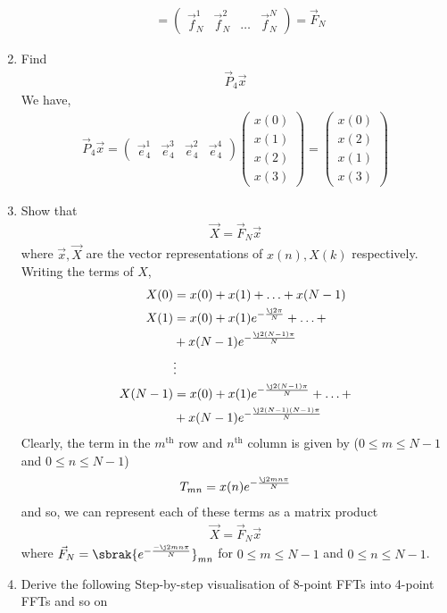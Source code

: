 \documentclass[journal,12pt,twocolumn]{IEEEtran}
\newcommand{\myvec}[1]{\ensuremath{\begin{pmatrix}#1\end{pmatrix}}}
\renewcommand\thesection{\arabic{section}}
\begin{document}
\begin{enumerate}[label=\thesection.\arabic*]
\begin{align}
	&= \myvec{\vec{f}_N^{1} & \vec{f}_N^{2} & \ldots & \vec{f}_N^{N}} = \vec{F}_N
\end{align}
\item Find 
    \begin{align}
	     \vec{P}_4 \vec{x}
    \end{align}
\solution We have,
\begin{align}
	\vec{P}_4\vec{x} = \myvec{\vec{e}_4^1 & \vec{e}_4^3 & \vec{e}_4^2 & \vec{e}_4^4}\myvec{x(0)\\x(1)\\x(2)\\x(3)} = \myvec{x(0)\\x(2)\\x(1)\\x(3)}
	\label{eq:x-permute}
\end{align}
\item Show that 
    \begin{align}
	    \vec{X} = \vec{F}_N\vec{x}
	    \label{eq:dft-mat-def}
    \end{align}
		where $\vec{x}, \vec{X}$ are the vector representations of $x(n), X(k)$ respectively. \\
\solution Writing the terms of $X$, 
\begin{align}
	X(0) &= x(0) + x(1) + \ldots + x(N - 1) \\
	X(1) &= x(0) + x(1)e^{-\frac{\j2\pi}{N}} + \ldots + \nonumber \\
		 &+ x(N - 1)e^{-\frac{\j2(N - 1)\pi}{N}} \\
		 &\vdots \nonumber \\
	X(N - 1) &= x(0) + x(1)e^{-\frac{\j2(N - 1)\pi}{N}} + \ldots + \nonumber \\
			 &+ x(N - 1)e^{-\frac{\j2(N - 1)(N - 1)\pi}{N}}	
\end{align}
Clearly, the term in the $m^{\text{th}}$ row and $n^{\text{th}}$ column is given by ($0 \leq m \leq N - 1$ and $0 \leq n \leq N - 1$) 
\begin{align}
	T_{mn} = x(n)e^{-\frac{\j2mn\pi}{N}} 
\end{align}
and so, we can represent each of these terms as a matrix product
\begin{align}
	\vec{X} = \vec{F}_N\vec{x}
\end{align}
where $\vec{F}_N = \sbrak{e^{-\frac{-\j2mn\pi}{N}}}_{mn}$ for $0 \leq m \leq N - 1$ and $0 \leq n \leq N - 1$. 
\item Derive the following Step-by-step visualisation  of
8-point FFTs into 4-point FFTs and so on
\begin{equation}

\end{equation}
\end{enumerate}
\end{document}
